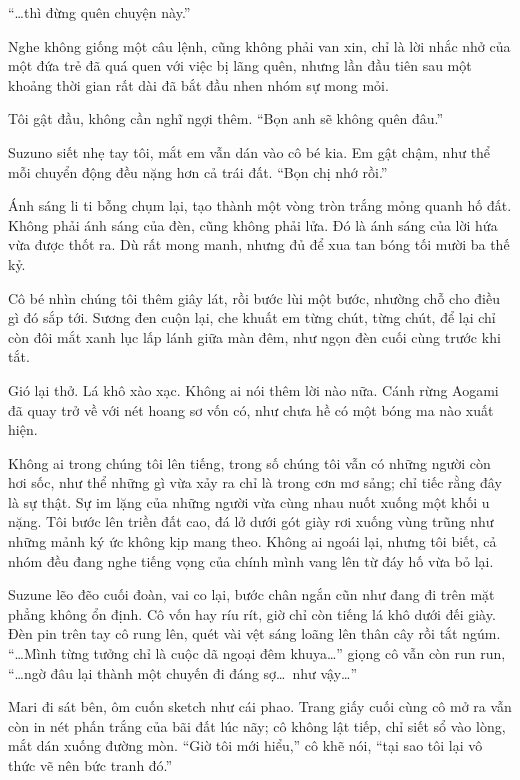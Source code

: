 \documentclass[../main.tex]{subfiles}
\begin{document}
``\dots thì đừng quên chuyện này.''

Nghe không giống một câu lệnh, cũng không phải van xin, chỉ là lời nhắc nhở của một đứa trẻ đã quá quen với việc bị lãng quên, nhưng lần đầu tiên sau một khoảng thời gian rất dài đã bắt đầu nhen nhóm sự mong mỏi.

Tôi gật đầu, không cần nghĩ ngợi thêm. ``Bọn anh sẽ không quên đâu.''

Suzuno siết nhẹ tay tôi, mắt em vẫn dán vào cô bé kia. Em gật chậm, như thể mỗi chuyển động đều nặng hơn cả trái đất. ``Bọn chị nhớ rồi.''

Ánh sáng li ti bỗng chụm lại, tạo thành một vòng tròn trắng mỏng quanh hố đất. Không phải ánh sáng của đèn, cũng không phải lửa. Đó là ánh sáng của lời hứa vừa được thốt ra. Dù rất mong manh, nhưng đủ để xua tan bóng tối mười ba thế kỷ.

Cô bé nhìn chúng tôi thêm giây lát, rồi bước lùi một bước, nhường chỗ cho điều gì đó sắp tới. Sương đen cuộn lại, che khuất em từng chút, từng chút, để lại chỉ còn đôi mắt xanh lục lấp lánh giữa màn đêm, như ngọn đèn cuối cùng trước khi tắt.

Gió lại thở. Lá khô xào xạc. Không ai nói thêm lời nào nữa. Cánh rừng Aogami đã quay trở về với nét hoang sơ vốn có, như chưa hề có một bóng ma nào xuất hiện.

Không ai trong chúng tôi lên tiếng, trong số chúng tôi vẫn có những người còn hơi sốc, như thể những gì vừa xảy ra chỉ là trong cơn mơ sảng; chỉ tiếc rằng đây là sự thật. Sự im lặng của những người vừa cùng nhau nuốt xuống một khối u nặng. Tôi bước lên triền đất cao, đá lở dưới gót giày rơi xuống vùng trũng như những mảnh ký ức không kịp mang theo. Không ai ngoái lại, nhưng tôi biết, cả nhóm đều đang nghe tiếng vọng của chính mình vang lên từ đáy hố vừa bỏ lại.

\ct

Suzune lẽo đẽo cuối đoàn, vai co lại, bước chân ngắn cũn như đang đi trên mặt phẳng không ổn định. Cô vốn hay ríu rít, giờ chỉ còn tiếng lá khô dưới đếi giày. Đèn pin trên tay cô rung lên, quét vài vệt sáng loãng lên thân cây rồi tắt ngúm. ``\dots Mình từng tưởng chỉ là cuộc dã ngoại đêm khuya\dots'' giọng cô vẫn còn run run, ``\dots ngờ đâu lại thành một chuyến đi đáng sợ\dots\ như vậy\dots''

Mari đi sát bên, ôm cuốn sketch như cái phao. Trang giấy cuối cùng cô mở ra vẫn còn in nét phấn trắng của bãi đất lúc nãy; cô không lật tiếp, chỉ siết sổ vào lòng, mắt dán xuống đường mòn. ``Giờ tôi mới hiểu,'' cô khẽ nói, ``tại sao tôi lại vô thức vẽ nên bức tranh đó.''
\end{document}
